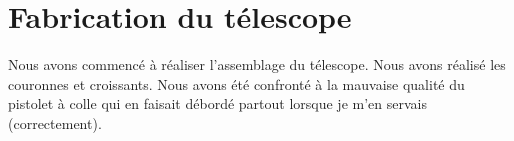 \chapter{Fabrication du télescope}

Nous avons commencé à réaliser l’assemblage du télescope. Nous avons réalisé les couronnes et croissants.
Nous avons été confronté à la mauvaise qualité du pistolet à colle qui en faisait débordé partout lorsque je m’en servais (correctement).


